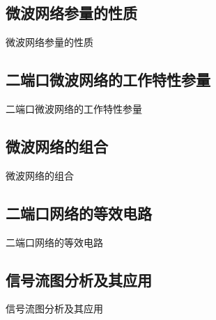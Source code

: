 \subsection{微波网络参量的性质}
\begin{frame}{微波网络参量的性质}

\end{frame}

\subsection{二端口微波网络的工作特性参量}
\begin{frame}{二端口微波网络的工作特性参量}

\end{frame}

\subsection{微波网络的组合}
\begin{frame}{微波网络的组合}

\end{frame}

\subsection{二端口网络的等效电路}
\begin{frame}{二端口网络的等效电路}

\end{frame}

\subsection{信号流图分析及其应用}
\begin{frame}{信号流图分析及其应用}

\end{frame}

